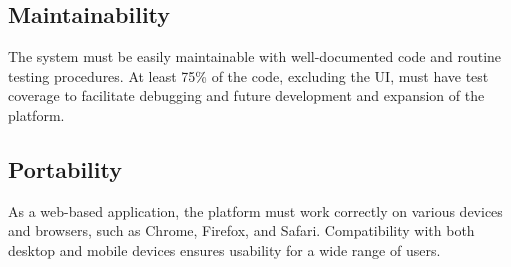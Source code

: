 \subsection{Maintainability}
\label{subsec: maintainability}%
The system must be easily maintainable with well-documented code and routine testing procedures. At least 75\% of the code, excluding the UI, must have test coverage to facilitate debugging and future development and expansion of the platform. 
\subsection{Portability}
\label{subsec: portability}%
As a web-based application, the platform must work correctly on various devices and browsers, such as Chrome, Firefox, and Safari. Compatibility with both desktop and mobile devices ensures usability for a wide range of users. 